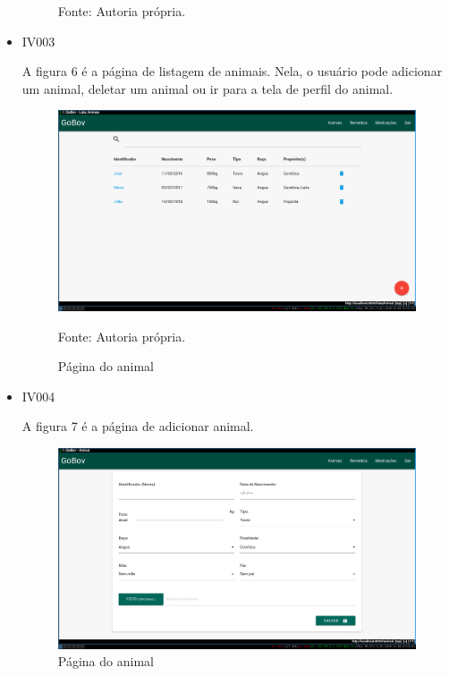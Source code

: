 \begin{itemize}
\begin{figure}[H]
\begin{center}
		Fonte: Autoria própria.
	\end{center}
\end{figure}

\newpage
\item IV003

A figura 6 é a página de listagem de animais. Nela, o usuário pode adicionar um animal, deletar um animal ou ir para a tela de perfil do animal.
\begin{figure}[H]
	\begin{center}
		\caption{Página do animal}
		\includegraphics[width=13cm]{../img/prototipos/listaAnimal.png}

		Fonte: Autoria própria.
	\end{center}
\end{figure}

\item IV004

A figura 7 é a página de adicionar animal.
\begin{figure}[H]
	\begin{center}
		\caption{Página do animal}
		\includegraphics[width=13cm]{../img/prototipos/addAnimal.png}


\end{center}
\end{figure}
\end{itemize}
